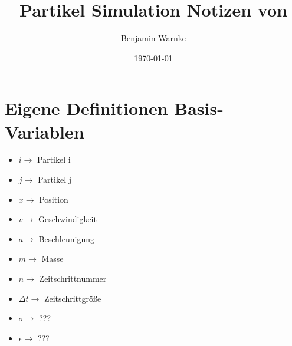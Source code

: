 \documentclass{article}
\title{Partikel Simulation Notizen von}
\author{Benjamin Warnke}
\date{\today}
\begin{document}
\maketitle
\begin{comment}
\section*{Skizze 1}

\setlength{\unitlength}{50pt}

\begin{picture}(0,0)
\linethickness{1pt} 
\put(0,-0){\line(+9,0){9}}
\put(0,-1){\line(+9,0){9}}
\put(0,-2){\line(+9,0){9}}
\put(0,-3){\line(+9,0){9}}
\put(0,-4){\line(+9,0){9}}
\put(0,-5){\line(+9,0){9}}
\put(0,-6){\line(+9,0){9}}
\put(0,-7){\line(+9,0){9}}
\put(0,-8){\line(+9,0){9}}
\put(0,-9){\line(+9,0){9}}
\put(+0,0){\line(0,-9){9}}
\put(+1,0){\line(0,-9){9}}
\put(+2,0){\line(0,-9){9}}
\put(+3,0){\line(0,-9){9}}
\put(+4,0){\line(0,-9){9}}
\put(+5,0){\line(0,-9){9}}
\put(+6,0){\line(0,-9){9}}
\put(+7,0){\line(0,-9){9}}
\put(+8,0){\line(0,-9){9}}
\put(+9,0){\line(0,-9){9}}
\linethickness{4pt} 
\put(4.5,-4.5){\line(0,+1){1}}
\put(4.5,-4.5){\line(1,+1){1}}
\put(4.5,-4.5){\line(1,+0){1}}
\put(4.5,-3.5){\line(1,-1){1}}
\end{picture}
\newpage
\end{comment}





\section*{Eigene Definitionen Basis-Variablen}
\begin{itemize}
	\item $i\rightarrow$ Partikel i
	\item $j\rightarrow$ Partikel j
	\item $x\rightarrow$ Position
	\item $v\rightarrow$ Geschwindigkeit
	\item $a\rightarrow$ Beschleunigung
	\item $m\rightarrow$ Masse
	\item $n\rightarrow$ Zeitschrittnummer
	\item $\Delta t\rightarrow$ Zeitschrittgröße
	\item $\sigma\rightarrow$ ???
	\item $\epsilon\rightarrow$ ???
\end{itemize}
\end{document}
